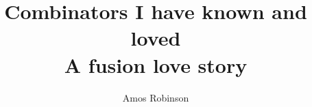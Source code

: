 \thispagestyle{empty}
\title{
  {\sc Combinators I have known and loved} \\
  {\sc \Large A fusion love story} \\
  }

\author{Amos Robinson}

\maketitle
